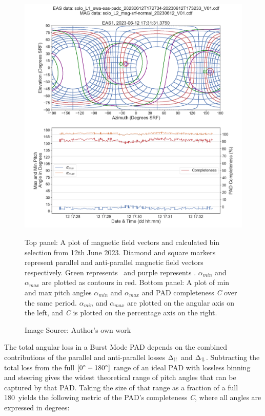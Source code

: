 \begin{figure}[h!]
    \centering
    \centerfloat
    \includegraphics[width=1.2\linewidth]{figures/Verbose Example 12062023.png}
    \caption{Top panel: A plot of magnetic field vectors and calculated bin selection from 12th June 2023. Diamond and square markers represent parallel and anti-parallel magnetic field vectors respectively. Green represents \Beas\ and purple represents \Bmag. \(\alpha_{min}\) and \(\alpha_{max}\) are plotted as contours in red. Bottom panel: A plot of min and max pitch angles \(\alpha_{min}\) and \(\alpha_{max}\) and PAD completeness \textit{C} over the same period. \(\alpha_{min}\) and \(\alpha_{max}\) are plotted on the angular axis on the left, and \textit{C} is plotted on the percentage axis on the right.}
    \caption*{Image Source: Author's own work}
    \label{fig: full contours + selection + loss}
\end{figure}

The total angular loss in a Burst Mode PAD depends on the combined contributions of the parallel and anti-parallel losses \(\Delta_{\upharpoonleft \! \upharpoonright}\) and \(\Delta_{\upharpoonleft \! \downharpoonright}\). Subtracting the total loss from the full \([0\degree-180\degree]\) range of an ideal PAD with lossless binning and steering gives the widest theoretical range of pitch angles that can be captured by that PAD. Taking the size of that range as a fraction of a full 180\degree\ yields the following metric of the PAD's completeness \textit{C}, where all angles are expressed in degrees:

